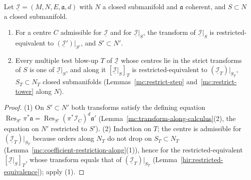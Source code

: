 \begin{lemma}
\label{mc:restrict-tower-along}
\leanok
Let \(\underline{\mathcal I}=(M,N,E,\mathfrak a,d)\) with \(N\) a closed submanifold and \(\mathfrak a\) coherent, and \(S\subset N\) a closed submanifold.
\begin{enumerate}
\item For a centre \(C\) admissible for \(\underline{\mathcal I}\) and for \(\underline{\mathcal I}|_S\), the transform of \(\underline{\mathcal I}|_S\) is restricted-equivalent to
\((\underline{\mathcal I}')|_{S'}\), and \(S'\subset N'\).
\item Every multiple test blow-up \(T\) of \(\underline{\mathcal I}\) whose centres lie in the strict transforms of \(S\) is one of \(\underline{\mathcal I}|_S\), and along it
\([\underline{\mathcal I}|_S]_T\) is restricted-equivalent to \((\underline{\mathcal I}_T)|_{S_T}\), \(S_T\subset N_T\) closed submanifolds
(Lemmas~\ref{mc:restrict-step} and~\ref{mc:restrict-tower} along \(N\)).
\end{enumerate}
\end{lemma}
\begin{proof}
\leanok
(1) On \(S'\subset N'\) both transforms satisfy the defining equation \(\operatorname{Res}_{S'}\pi^*\mathfrak a=\operatorname{Res}_{S'}(\pi^*\mathcal I_C)^d\mathfrak a'\)
(Lemma~\ref{mc:transform-along-calculus}(2), the equation on \(N'\) restricted to \(S'\)). (2) Induction on \(T\); the centre is admissible for \((\underline{\mathcal I}_T)|_{S_T}\)
because orders along \(N_T\) do not drop on \(S_T\subset N_T\) (Lemma~\ref{mc:coefficient-restriction-along}(1)), hence for the restricted-equivalent
\([\underline{\mathcal I}|_S]_T\), whose transform equals that of \((\underline{\mathcal I}_T)|_{S_T}\) (Lemma~\ref{hir:restricted-equivalence}); apply (1).
\end{proof}

